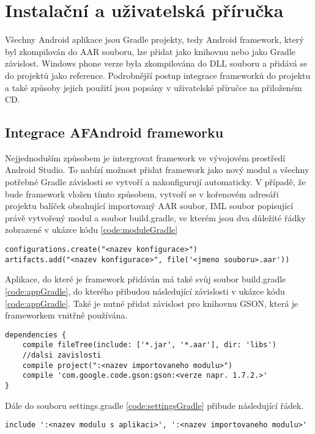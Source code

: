 \chapter{Instalační a uživatelská příručka}
Všechny Android aplikace jsou Gradle projekty, tedy Android framework, který byl zkompilován do AAR souboru, lze přidat jako knihovnu nebo jako Gradle závislost. Windows phone verze byla zkompilována do DLL souboru a přidává se do projektů jako reference. Podrobnější postup integrace frameworků do projektu a také způsoby jejich použití jsou popsány v uživatelské příručce na přiloženém CD.

\section{Integrace AFAndroid frameworku}
Nejjednoduším způsobem je intergrovat framework ve vývojovém prostředí Android Studio. To nabízí možnost přidat framework jako nový modul a všechny potřebné Gradle závislosti se vytvoří a nakonfigurují automaticky. V případě, že bude framework vložen tímto způsobem, vytvoří se v kořenovém adresáři projektu balíček obsahující importovaný AAR soubor, IML soubor popisující právě vytvořený modul a soubor build.gradle, ve kterém jsou dva důležité řádky zobrazené v ukázce kódu \ref{code:moduleGradle}
\begin{lstlisting}[caption={Gradle soubor pro build v balíčku s novým modulem},
label={code:moduleGradle}, basicstyle=\footnotesize, frame=single]
configurations.create("<nazev konfigurace>") 
artifacts.add("<nazev konfigurace>", file('<jmeno souboru>.aar'))
\end{lstlisting}

Aplikace, do které je framework přidáván má také svůj soubor build.gradle \ref{code:appGradle}, do kterého přibudou následující závislosti v ukázce kódu \ref{code:appGradle}. Také je nutné přidat závislost pro knihovnu GSON, která je frameworkem vnitřně používána. 
\begin{lstlisting}[caption={Gradle soubor pro build aplikace, do které je framework integrován},
label={code:appGradle}, basicstyle=\footnotesize, frame=single]
dependencies {
	compile fileTree(include: ['*.jar', '*.aar'], dir: 'libs')  
	//dalsi zavislosti     
	compile project(":<nazev importovaneho modulu>") 
	compile 'com.google.code.gson:gson:<verze napr. 1.7.2.>'
} 
\end{lstlisting}

Dále do souboru settings.gradle \ref{code:settingsGradle} přibude následující řádek.
\begin{lstlisting}[caption={Gradle soubor s nastaveními aplikace, do které je framework integrován },
label={code:settingsGradle}, basicstyle=\footnotesize, frame=single ]
include ':<nazev modulu s aplikaci>', ':<nazev importovaneho modulu>' 
\end{lstlisting}

